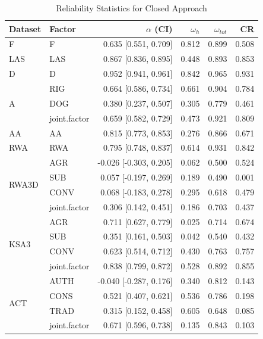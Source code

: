 \begin{table}[htbp]
\centering
\caption{Reliability Statistics for Closed Approach}
\label{tab:reliability-closed}
\begin{tabular}{llrrrr}
\hline
Dataset & Factor & $\alpha$ (CI) & $\omega_h$ & $\omega_{tot}$ & CR \\
\hline
F & \quad F & 0.635 [0.551, 0.709] & 0.812 & 0.899 & 0.508 \\
\hline
LAS & \quad LAS & 0.867 [0.836, 0.895] & 0.448 & 0.893 & 0.853 \\
\hline
D & \quad D & 0.952 [0.941, 0.961] & 0.842 & 0.965 & 0.931 \\
\hline
\multirow{3}{*}{A} & \quad RIG & 0.664 [0.586, 0.734] & 0.661 & 0.904 & 0.784 \\
 & \quad DOG & 0.380 [0.237, 0.507] & 0.305 & 0.779 & 0.461 \\
 & \quad joint.factor & 0.659 [0.582, 0.729] & 0.473 & 0.921 & 0.809 \\
\hline
AA & \quad AA & 0.815 [0.773, 0.853] & 0.276 & 0.866 & 0.671 \\
\hline
RWA & \quad RWA & 0.795 [0.748, 0.837] & 0.614 & 0.931 & 0.842 \\
\hline
\multirow{4}{*}{RWA3D} & \quad AGR & -0.026 [-0.303, 0.205] & 0.062 & 0.500 & 0.524 \\
 & \quad SUB & 0.057 [-0.197, 0.269] & 0.189 & 0.490 & 0.001 \\
 & \quad CONV & 0.068 [-0.183, 0.278] & 0.295 & 0.618 & 0.479 \\
 & \quad joint.factor & 0.306 [0.142, 0.451] & 0.186 & 0.703 & 0.437 \\
\hline
\multirow{4}{*}{KSA3} & \quad AGR & 0.711 [0.627, 0.779] & 0.025 & 0.714 & 0.674 \\
 & \quad SUB & 0.351 [0.161, 0.503] & 0.042 & 0.540 & 0.432 \\
 & \quad CONV & 0.623 [0.514, 0.712] & 0.430 & 0.763 & 0.757 \\
 & \quad joint.factor & 0.838 [0.799, 0.872] & 0.528 & 0.892 & 0.855 \\
\hline
\multirow{4}{*}{ACT} & \quad AUTH & -0.040 [-0.287, 0.176] & 0.340 & 0.812 & 0.143 \\
 & \quad CONS & 0.521 [0.407, 0.621] & 0.536 & 0.786 & 0.198 \\
 & \quad TRAD & 0.315 [0.152, 0.458] & 0.605 & 0.648 & 0.085 \\
 & \quad joint.factor & 0.671 [0.596, 0.738] & 0.135 & 0.843 & 0.103 \\
\hline

\end{tabular}
\end{table}
